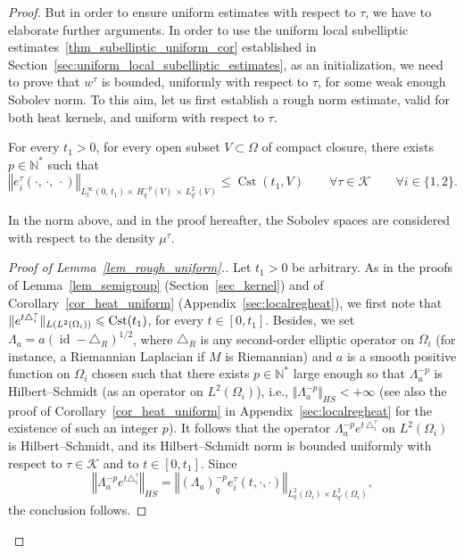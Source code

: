 \documentclass[AHL,Unicode,published]{cedram}
\newcommand*\N{\mathbb{N}}
\newcommand{\calK}{\mathcal{K}}
\DeclareMathOperator{\Cst}{Cst}
\DeclareMathOperator{\id}{id}
\renewcommand{\leq}{\leqslant}
\let\oldforall\forall
\renewcommand*{\forall}{\mathrel{\oldforall}}
\begin{document}
\begin{proof}
But in order to ensure uniform estimates with respect to $\tau$, we have to elaborate further arguments. In order to use the uniform local subelliptic estimates~\eqref{thm_subelliptic_uniform_cor} established in Section~\ref{sec:uniform_local_subelliptic_estimates}, as an initialization, we need to prove that $w^\tau$ is bounded, uniformly with respect to $\tau$, for some weak enough Sobolev norm. To this aim, let us first establish a rough norm estimate, valid for both heat kernels, and uniform with respect to $\tau$.

\begin{lemm}\label{lem_rough_uniform}
For every $t_1>0$, for every open subset $V\subset\Omega$ of compact closure, there exists $p\in\N^*$ such that
\[
\left\Vert e^\tau_i(\cdot,\,\cdot,\,\cdot) \right\Vert_{L^\infty_t(0,\,t_1)\times\,H^{-p}_q(V)\,\times\,L^2_{q'}(V)} \leq \Cst(t_1,V)
\qquad\forall \tau\in\calK\qquad \forall i\in\{1,2\}.
\]
\end{lemm}

In the norm above, and in the proof hereafter, the Sobolev spaces are considered with respect to the density $\mu^\tau$.

\begin{proof}[{Proof of Lemma~\ref{lem_rough_uniform}.}]
Let $t_1>0$ be arbitrary. As in the proofs of Lemma~\ref{lem_semigroup} (Section~\ref{sec_kernel}) and of Corollary~\ref{cor_heat_uniform} (Appendix~\ref{sec:localregheat}), we first note that $\Vert e^{t\triangle^\tau_i}\Vert_{L(L^2(\Omega_i))}\linebreak\leq \Cst(t_1)$, for every $t\in[0,t_1]$. Besides, we set $\Lambda_a = a (\id-\triangle_R)^{1/2}$, where $\triangle_R$ is any second-order elliptic operator on $\Omega_i$ (for instance, a Riemannian Laplacian if $M$ is Riemannian) and $a$ is a smooth positive function on $\Omega_i$ chosen such that there exists $p\in\N^*$ large enough so that $\Lambda_a^{-p}$ is Hilbert--Schmidt (as an operator on $L^2(\Omega_i)$), i.e., $\Vert \Lambda_a^{-p} \Vert_{HS}<+\infty$ (see also the proof of Corollary~\ref{cor_heat_uniform} in Appendix~\ref{sec:localregheat} for the existence of such an integer $p$). It follows that the operator $\Lambda_a^{-p} e^{t\,\triangle^\tau_i}$ on $L^2(\Omega_i)$ is Hilbert--Schmidt, and its Hilbert--Schmidt norm is bounded uniformly with respect to $\tau\in\calK$ and to $t\in[0,t_1]$. Since
\[
\left\Vert \Lambda_a^{-p} e^{t\triangle^\tau_i}\right\Vert_{HS} = \left\Vert (\Lambda_a)_q^{-p} e^\tau_i(t,\cdot,\cdot)\right\Vert_{L^2_q(\Omega_i)\times L^2_{q'}(\Omega_i)},
\]
the conclusion follows.
\end{proof}


\end{proof}
\end{document}
